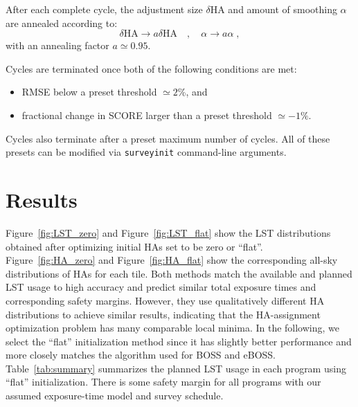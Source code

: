 \documentclass[12pt]{article}
\providecommand{\tab}[1]{Table~\ref{tab:#1}}
\providecommand{\fig}[1]{Figure~\ref{fig:#1}}
\begin{document}
After each complete cycle, the adjustment size $\delta\text{HA}$ and amount of smoothing $\alpha$ are annealed according to:
$$
\delta\text{HA} \rightarrow a \delta\text{HA} \quad, \quad
\alpha\rightarrow a \alpha \; ,
$$
with an annealing factor $a \simeq 0.95$.

Cycles are terminated once both of the following conditions are met:
\begin{itemize}
    \item RMSE below a preset threshold $\simeq 2$\%, and
    \item fractional change in SCORE larger than a preset threshold $\simeq -1\%$.
\end{itemize}
Cycles also terminate after a preset maximum number of cycles.  All of these presets can be modified via {\tt surveyinit} command-line arguments.

\section{Results}

\fig{LST_zero} and \fig{LST_flat} show the LST distributions obtained after optimizing initial HAs set to be zero or ``flat''.  \fig{HA_zero} and \fig{HA_flat} show the corresponding all-sky distributions of HAs for each tile.  Both methods match the available and planned LST usage to high accuracy and predict similar total exposure times and corresponding safety margins. However, they use qualitatively different HA distributions to achieve similar results, indicating that the HA-assignment optimization problem has many comparable local minima.  In the following, we select the ``flat'' initialization method since it has slightly better performance and more closely matches the algorithm used for BOSS and eBOSS.  \tab{summary} summarizes the planned LST usage in each program using ``flat'' initialization.  There is some safety margin for all programs with our assumed exposure-time model and survey schedule.
\end{document}

